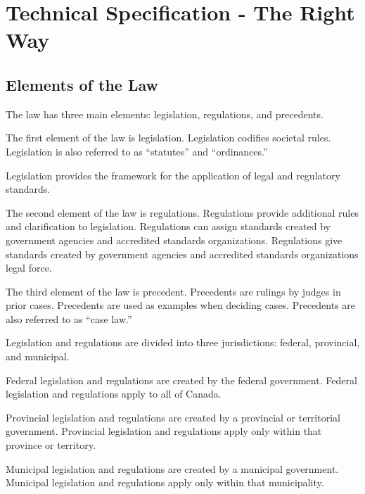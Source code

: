 \documentclass{tech-spec}
\begin{document}
  \chapter{Technical Specification - The Right Way}

  \section*{Elements of the Law}

  \begin{parnumbers}
    The law has three main elements: legislation, regulations, and precedents.

    The first element of the law is legislation. Legislation codifies societal rules. Legislation is also referred to as “statutes” and “ordinances.”

    Legislation provides the framework for the application of legal and regulatory standards.

    The second element of the law is regulations. Regulations provide additional rules and clarification to legislation. Regulations can assign standards created by government agencies and accredited standards organizations. Regulations give standards created by government agencies and accredited standards organizations legal force.

    The third element of the law is precedent. Precedents are rulings by judges in prior cases. Precedents are used as examples when deciding cases. Precedents are also referred to as “case law.”

    Legislation and regulations are divided into three jurisdictions: federal, provincial, and municipal.

    Federal legislation and regulations are created by the federal government. Federal legislation and regulations apply to all of Canada.

    Provincial legislation and regulations are created by a provincial or territorial government. Provincial legislation and regulations apply only within that province or territory.

    Municipal legislation and regulations are created by a municipal government. Municipal legislation and regulations apply only within that municipality.
  \end{parnumbers}

\end{document}
